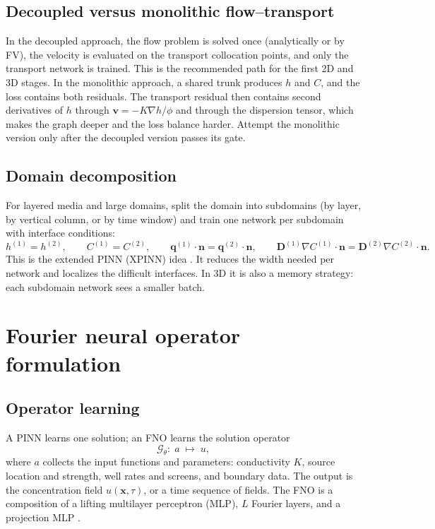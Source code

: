\documentclass[11pt]{article}
\newcommand{\DD}{\mathbf{D}}
\newcommand{\vv}{\mathbf{v}}
\newcommand{\xx}{\mathbf{x}}
\newcommand{\nn}{\mathbf{n}}
\begin{document}
\subsection{Decoupled versus monolithic flow--transport}

In the decoupled approach, the flow problem is solved once (analytically or by
FV), the velocity is evaluated on the transport collocation points, and only
the transport network is trained.  This is the recommended path for the first
2D and 3D stages.  In the monolithic approach, a shared trunk produces $h$ and
$C$, and the loss contains both residuals.  The transport residual then
contains second derivatives of $h$ through $\vv=-K\nabla h/\phi$ and through
the dispersion tensor, which makes the graph deeper and the loss balance
harder.  Attempt the monolithic version only after the decoupled version
passes its gate.

\subsection{Domain decomposition}

For layered media and large domains, split the domain into subdomains
(by layer, by vertical column, or by time window) and train one network per
subdomain with interface conditions:
\begin{equation}
\label{eq:interface}
h^{(1)}=h^{(2)},\qquad
C^{(1)}=C^{(2)},\qquad
\mathbf{q}^{(1)}\cdot\nn=\mathbf{q}^{(2)}\cdot\nn,\qquad
\DD^{(1)}\nabla C^{(1)}\cdot\nn=\DD^{(2)}\nabla C^{(2)}\cdot\nn .
\end{equation}
This is the extended PINN (XPINN) idea \citep{jagtap2020xpinn}.  It reduces the
width needed per network and localizes the difficult interfaces.  In 3D it is
also a memory strategy: each subdomain network sees a smaller batch.

\section{Fourier neural operator formulation}
\label{sec:fno}

\subsection{Operator learning}

A PINN learns one solution; an FNO learns the solution operator
\begin{equation}
\label{eq:operator}
\mathcal{G}_\theta:\;a\;\longmapsto\;u,
\end{equation}
where $a$ collects the input functions and parameters: conductivity $K$, source
location and strength, well rates and screens, and boundary data.  The output
is the concentration field $u(\xx,\tau)$, or a time sequence of fields.  The FNO
is a composition of a lifting multilayer perceptron (MLP), $L$ Fourier layers,
and a projection MLP \citep{li2021fno,kovachki2023neural}.
\end{document}
